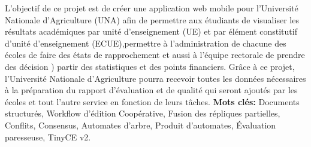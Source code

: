 \let\oldprintchaptertitle=\printchaptertitle
\renewcommand{\printchaptertitle}[1]{%
	\vspace*{-75pt}
	\oldprintchaptertitle{#1}
}%
\let\printchaptertitle=\oldprintchaptertitle
L'objectif de ce projet est de créer une application web mobile pour l’Université Nationale d’Agriculture (UNA) afin de permettre aux étudiants de visualiser les résultats académiques par unité d’enseignement (UE) et par élément constitutif d’unité d’enseignement (ECUE),permettre à l’administration de chacune des écoles de faire des états de rapprochement et aussi à l’équipe rectorale de prendre des décision ) partir des statistiques et des points financiers.
Grâce à ce projet, l’Université Nationale d’Agriculture  pourra recevoir toutes les données nécessaires à la préparation du rapport d'évaluation et de qualité qui seront ajoutés par les écoles et tout l’autre service en fonction de leurs tâches.
\vspace{1cm}
\noindent\textbf{Mots clés:} Documents structur\'es, Workflow d'édition Coop\'erative,  Fusion des r\'epliques partielles, Conflits, Consensus, Automates d'arbre, Produit d'automates,  Évaluation paresseuse, TinyCE v2.

\myCleanStarChapterEnd
